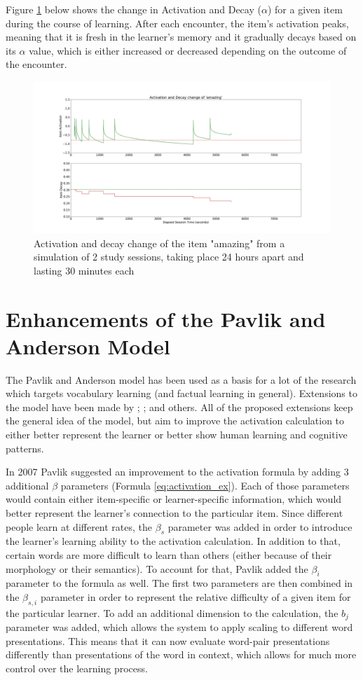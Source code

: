 \documentclass[a4paper]{report}
\begin{document}
Figure \ref{graph_act} below shows the change in Activation and Decay ($\alpha$) for a given item during the course of learning. After each encounter, the item's activation peaks, meaning that it is fresh in the learner's memory and it gradually decays based on its $\alpha$ value, which is either increased or decreased depending on the outcome of the encounter.
\begin{figure}[h]
\centering
\includegraphics[width=12cm]{graph_activation.jpg}
\caption{Activation and decay change of the item "amazing" from a simulation of 2 study sessions, taking place 24 hours apart and lasting 30 minutes each}
\label{graph_act}
\end{figure}

\section{Enhancements of the Pavlik and Anderson Model}
The Pavlik and Anderson model has been used as a basis for a lot of the research which targets vocabulary learning (and factual learning in general). Extensions to the model have been made by \cite{pavlik07}; \cite{vans09}; \cite{nijboer11} and others. All of the proposed extensions keep the general idea of the model, but aim to improve the activation calculation to either better represent the learner or better show human learning and cognitive patterns.

In 2007 Pavlik suggested an improvement to the activation formula by adding 3 additional $\beta$ parameters (Formula \ref{eq:activation_ex}). Each of those parameters would contain either item-specific or learner-specific information, which would better represent the learner's connection to the particular item. Since different people learn at different rates, the $\beta_s$ parameter was added in order to introduce the learner's learning ability to the activation calculation. In addition to that, certain words are more difficult to learn than others (either because of their morphology or their semantics). To account for that, Pavlik added the $\beta_i$ parameter to the formula as well. The first two parameters are then combined in the $\beta_{s,i}$ parameter in order to represent the relative difficulty of a given item for the particular learner. To add an additional dimension to the calculation, the $b_j$ parameter was added, which allows the system to apply scaling to different word presentations. This means that it can now evaluate word-pair presentations differently than presentations of the word in context, which allows for much more control over the learning process. \citep{pavlik07}
\end{document}
